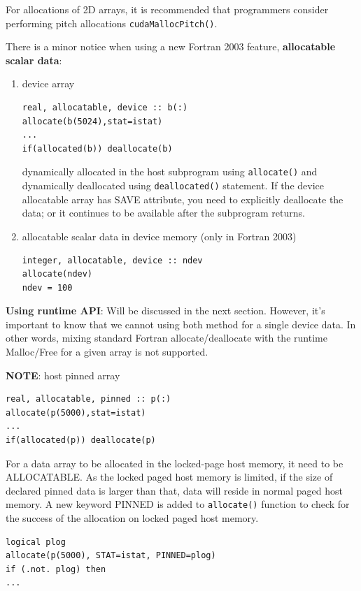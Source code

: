 
\begin{framed}
  For allocations of 2D arrays, it is recommended that programmers
  consider performing pitch allocations \verb!cudaMallocPitch()!.
\end{framed}

There is a minor notice when using a new Fortran 2003 feature,
{\bf allocatable scalar data}:
\begin{enumerate}
\item device array
\begin{lstlisting}
real, allocatable, device :: b(:)
allocate(b(5024),stat=istat)
...
if(allocated(b)) deallocate(b)
\end{lstlisting}
  dynamically allocated in the host subprogram using \verb!allocate()!
  and dynamically deallocated using \verb!deallocated()! statement. 
  If the device allocatable array has SAVE attribute, you need to
  explicitly deallocate the data; or it continues to be
  available after the subprogram returns.


\item allocatable scalar data in device memory (only in Fortran 2003)
\begin{lstlisting}
integer, allocatable, device :: ndev
allocate(ndev)
ndev = 100
\end{lstlisting}
\end{enumerate}


{\bf Using runtime API}: Will be discussed in the next
section. However, it's important to know that we cannot using both
method for a single device data. In other words, mixing standard
Fortran allocate/deallocate with the runtime Malloc/Free for a given
array is not supported.



{\bf NOTE}: host pinned array
\begin{lstlisting}
real, allocatable, pinned :: p(:)
allocate(p(5000),stat=istat)
...
if(allocated(p)) deallocate(p)
\end{lstlisting}
For a data array to be allocated in the locked-page host memory, it
need to be ALLOCATABLE.  As the locked paged host memory is limited,
if the size of declared pinned data is larger than that, data will
reside in normal paged host memory. A new keyword PINNED is added to
\verb.allocate(). function to check for the success of the
allocation on locked paged host memory.
\begin{lstlisting}
logical plog
allocate(p(5000), STAT=istat, PINNED=plog)
if (.not. plog) then
...
\end{lstlisting}

